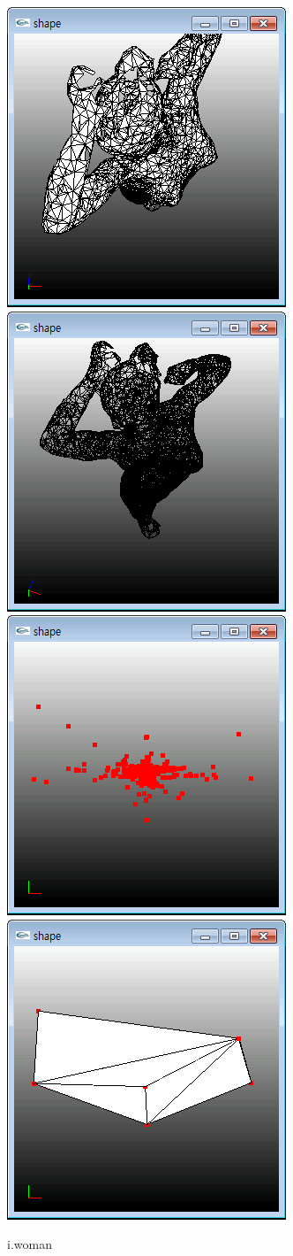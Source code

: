 \documentclass[11pt]{article}
\begin{document}
\begin{figure}[ht]
\centering
\includegraphics[width=.23\textwidth]{FIGS/woman1}
\hspace{0.2cm}
\includegraphics[width=.23\textwidth]{FIGS/woman2}
\hspace{0.2cm}
\includegraphics[width=.23\textwidth]{FIGS/woman3}
\hspace{0.2cm}
\includegraphics[width=.23\textwidth]{FIGS/woman4}
\caption{i.woman}
\end{figure}
\end{document}
